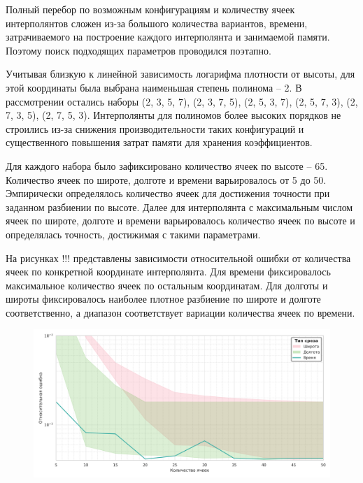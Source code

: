 Полный перебор по возможным конфигурациям и количеству ячеек интерполянтов сложен
из-за большого количества вариантов, времени, затрачиваемого на построение каждого интерполянта и
занимаемой памяти. Поэтому поиск подходящих параметров проводился поэтапно.

Учитывая близкую к линейной зависимость логарифма плотности от высоты, для этой координаты
была выбрана наименьшая степень полинома -- 2. В рассмотрении остались наборы 
(2, 3, 5, 7), (2, 3, 7, 5), (2, 5, 3, 7), (2, 5, 7, 3), (2, 7, 3, 5),
(2, 7, 5, 3). Интерполянты для полиномов более
высоких порядков не строились из-за снижения производительности таких конфигураций и
существенного повышения затрат памяти для хранения коэффициентов.

Для каждого набора было зафиксировано количество ячеек по высоте -- 65. Количество ячеек
по широте, долготе и времени варьировалось от 5 до 50. Эмпирически определялось
количество ячеек для достижения точности при заданном разбиении по высоте. Далее
для интерполянта с максимальным числом ячеек по широте, долготе и времени варьировалось
количество ячеек по высоте и определялась точность, достижимая с такими параметрами.

На рисунках !!! представлены зависимости относительной ошибки от количества ячеек по
конкретной координате интерполянта. Для времени фиксировалось
максимальное количество ячеек по остальным координатам. Для долготы и широты
фиксировалось наиболее плотное разбиение по широте и долготе соответственно, а диапазон
соответствует вариации количества ячеек по времени.

\begin{figure}[h!]
    \centering
    \includegraphics[width=\linewidth]{../images/solution/atmo/2357.png}
    \label{fig:atmo:2357}
 \end{figure}

